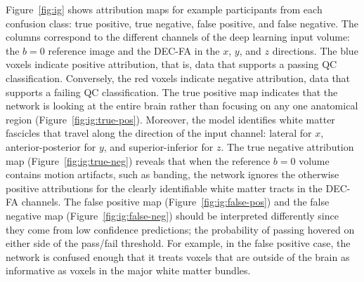 \documentclass[9pt,lineno]{elife}
\begin{document}
Figure~\ref{fig:ig} shows attribution maps for example participants from each
confusion class: true positive, true negative, false positive, and false
negative. The columns correspond to the different channels of the deep learning
input volume: the $b=0$ reference image and the DEC-FA in the $x$, $y$, and $z$
directions. The blue voxels indicate positive attribution, that is, data that supports a passing QC classification. Conversely, the red voxels indicate negative attribution, data that supports a failing QC classification.
The true positive map indicates that the network is looking at the
entire brain rather than focusing on any one anatomical region
(Figure~\ref{fig:ig:true-pos}). Moreover, the model identifies white matter
fascicles that travel along the direction of the input channel: lateral for $x$,
anterior-posterior for $y$, and superior-inferior for $z$. The true negative
attribution map (Figure~\ref{fig:ig:true-neg}) reveals that when the reference
$b=0$ volume contains motion artifacts, such as banding, the network ignores the
otherwise positive attributions for the clearly identifiable white matter tracts
in the DEC-FA channels. The false positive map (Figure~\ref{fig:ig:false-pos})
and the false negative map (Figure~\ref{fig:ig:false-neg}) should be interpreted
differently since they come from low confidence predictions; the probability of
passing hovered on either side of the pass/fail threshold. For example, in the
false positive case, the network is confused enough that it treats voxels that
are outside of the brain as informative as voxels in the major white matter
bundles.
\end{document}

